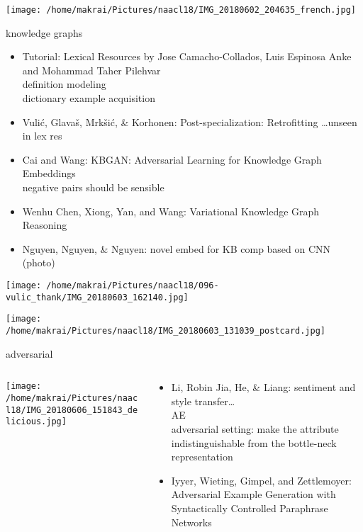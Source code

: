 \documentclass{beamer}
\begin{document}
\begin{frame}
  \texttt{[image: /home/makrai/Pictures/naacl18/IMG\_20180602\_204635\_french.jpg]}
\end{frame}

\begin{frame}[allowframebreaks]{knowledge graphs}
  \begin{itemize}
    \item Tutorial: Lexical Resources 
      by Jose Camacho-Collados, Luis Espinosa Anke and Mohammad Taher Pilehvar 
                \\ definition modeling
                \\ dictionary example acquisition
              \item Vulić, Glavaš, Mrkšić, \& Korhonen: 
                Post-specialization: Retrofitting \dots  unseen in lex res
              \item Cai and Wang: KBGAN: Adversarial Learning for Knowledge Graph Embeddings
                \\ negative pairs should be sensible
              \item Wenhu Chen, Xiong, Yan, and Wang: Variational Knowledge Graph Reasoning
              \item Nguyen, Nguyen, \& Nguyen: novel embed for KB comp based on CNN (photo)
  \end{itemize}
  \texttt{[image: /home/makrai/Pictures/naacl18/096-vulic\_thank/IMG\_20180603\_162140.jpg]}

\end{frame}

\begin{frame}
  \texttt{[image: /home/makrai/Pictures/naacl18/IMG\_20180603\_131039\_postcard.jpg]}
\end{frame}

\begin{frame}{adversarial}
  \begin{columns}
    \begin{column}{.35\textwidth}
      \centering 
      \texttt{[image: /home/makrai/Pictures/naacl18/IMG\_20180606\_151843\_delicious.jpg]}
    \end{column}
    \begin{column}{.65\textwidth}
      \begin{itemize}
        \item Li, Robin Jia, He, \& Liang: sentiment and style transfer\dots 
          \\ AE
          \\ adversarial setting: make the attribute indistinguishable from the
          bottle-neck representation
        \item Iyyer, Wieting, Gimpel, and Zettlemoyer:  
          Adversarial Example Generation 
          with Syntactically Controlled Paraphrase Networks
      \end{itemize}
    \end{column}
  \end{columns}
\end{frame}
\end{document}
